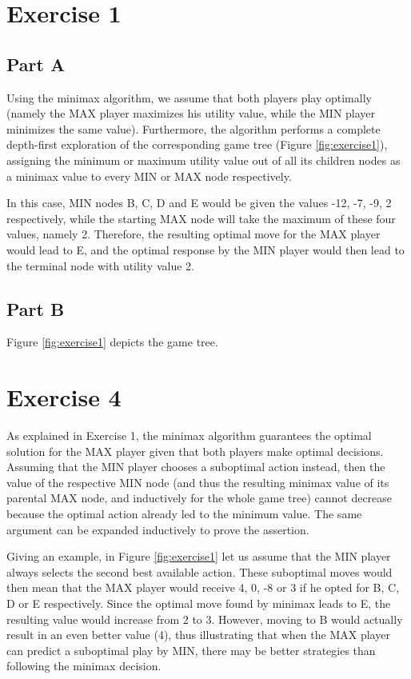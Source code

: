 \section*{Exercise 1}
\label{sec:exercise1}

\subsection*{Part A}

Using the minimax algorithm, we assume that both players play optimally (namely the MAX player maximizes his utility value, while the MIN player minimizes the same value). Furthermore, the algorithm performs a complete depth-first exploration of the corresponding game tree (Figure \ref{fig:exercise1}), assigning the minimum or maximum utility value out of all its children nodes as a minimax value to every MIN or MAX node respectively. 

In this case, MIN nodes B, C, D and E would be given the values -12, -7, -9, 2 respectively, while the starting MAX node will take the maximum of these four values, namely 2. Therefore, the resulting optimal move for the MAX player would lead to E, and the optimal response by the MIN player would then lead to the terminal node with utility value 2.

\subsection*{Part B}

Figure \ref{fig:exercise1} depicts the game tree.



\section*{Exercise 4}

As explained in Exercise 1, the minimax algorithm guarantees the optimal solution for the MAX player given that both players make optimal decisions. Assuming that the MIN player chooses a suboptimal action instead, then the value of the respective MIN node (and thus the resulting minimax value of its parental MAX node, and inductively for the whole game tree) cannot decrease because the optimal action already led to the minimum value. The same argument can be expanded inductively to prove the assertion.

Giving an example, in Figure \ref{fig:exercise1} let us assume that the MIN player always selects the second best available action. These suboptimal moves would then mean that the MAX player would receive 4, 0, -8 or 3 if he opted for B, C, D or E respectively. Since the optimal move found by minimax leads to E, the resulting value would increase from 2 to 3. However, moving to B would actually result in an even better value (4), thus illustrating that when the MAX player can predict a suboptimal play by MIN, there may be better strategies than following the minimax decision.

